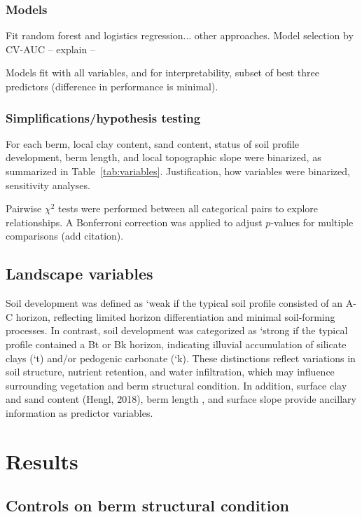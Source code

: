 \documentclass[review]{elsarticle}
\begin{document}
\subsubsection*{Models}
Fit random forest and logistics regression... other approaches. 
Model selection by CV-AUC -- explain -- 

Models fit with all variables, 
and for interpretability, 
subset of best three predictors (difference in performance is minimal). 


\subsubsection*{Simplifications/hypothesis testing}

For each berm, local clay content, sand content, status of soil profile development, berm length, and local topographic slope were binarized, as summarized in Table~\ref{tab:variables}.  
Justification, how variables were binarized, sensitivity analyses.

Pairwise $\chi^2$ tests were performed between all categorical pairs to explore relationships. A Bonferroni correction was applied to adjust $p$-values for multiple comparisons (add citation).


\subsection{Landscape variables}

Soil development was defined as `weak if the typical soil profile consisted of an A-C horizon, reflecting limited horizon differentiation and minimal soil-forming processes. In contrast, soil development was categorized as `strong if the typical profile contained a Bt or Bk horizon, indicating illuvial accumulation of silicate clays (`t) and/or pedogenic carbonate (`k). These distinctions reflect variations in soil structure, nutrient retention, and water infiltration, which may influence surrounding vegetation and berm structural condition. In addition, surface clay and sand content (Hengl, 2018), berm length \citep{nichols2021landscape}, and surface slope provide ancillary information as predictor variables.            

\section{Results}

\subsection{Controls on berm structural condition}
\end{document}
